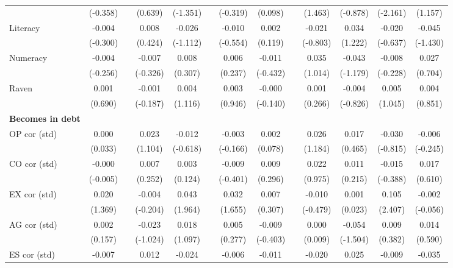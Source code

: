 \begin{table}[htbp]
{\begin{tabular}{lcccccccccccc}
      & (-0.358) &   & (0.639) & (-1.351) &   & (-0.319) & (0.098) &   & (1.463) & (-0.878) & (-2.161) & (1.157) \\
    Literacy & -0.004 &   & 0.008 & -0.026 &   & -0.010 & 0.002 &   & -0.021 & 0.034 & -0.020 & -0.045 \\
      & (-0.300) &   & (0.424) & (-1.112) &   & (-0.554) & (0.119) &   & (-0.803) & (1.222) & (-0.637) & (-1.430) \\
    Numeracy & -0.004 &   & -0.007 & 0.008 &   & 0.006 & -0.011 &   & 0.035 & -0.043 & -0.008 & 0.027 \\
      & (-0.256) &   & (-0.326) & (0.307) &   & (0.237) & (-0.432) &   & (1.014) & (-1.179) & (-0.228) & (0.704) \\
    Raven & 0.001 &   & -0.001 & 0.004 &   & 0.003 & -0.000 &   & 0.001 & -0.004 & 0.005 & 0.004 \\
      & (0.690) &   & (-0.187) & (1.116) &   & (0.946) & (-0.140) &   & (0.266) & (-0.826) & (1.045) & (0.851) \\
    \midrule
    \textbf{Becomes in debt} &   &   &   &   &   &   &   &   &   &   &   &  \\
    OP cor (std) & 0.000 &   & 0.023 & -0.012 &   & -0.003 & 0.002 &   & 0.026 & 0.017 & -0.030 & -0.006 \\
      & (0.033) &   & (1.104) & (-0.618) &   & (-0.166) & (0.078) &   & (1.184) & (0.465) & (-0.815) & (-0.245) \\
    CO cor (std) & -0.000 &   & 0.007 & 0.003 &   & -0.009 & 0.009 &   & 0.022 & 0.011 & -0.015 & 0.017 \\
      & (-0.005) &   & (0.252) & (0.124) &   & (-0.401) & (0.296) &   & (0.975) & (0.215) & (-0.388) & (0.610) \\
    EX cor (std) & 0.020 &   & -0.004 & \cellcolor[rgb]{ 1,  1,  0}0.043 &   & \cellcolor[rgb]{ 1,  1,  0}0.032 & 0.007 &   & -0.010 & 0.001 & \cellcolor[rgb]{ 1,  1,  0}0.105 & -0.002 \\
      & (1.369) &   & (-0.204) & (1.964) &   & (1.655) & (0.307) &   & (-0.479) & (0.023) & (2.407) & (-0.056) \\
    AG cor (std) & 0.002 &   & -0.023 & 0.018 &   & 0.005 & -0.009 &   & 0.000 & -0.054 & 0.009 & 0.014 \\
      & (0.157) &   & (-1.024) & (1.097) &   & (0.277) & (-0.403) &   & (0.009) & (-1.504) & (0.382) & (0.590) \\
    ES cor (std) & -0.007 &   & 0.012 & -0.024 &   & -0.006 & -0.011 &   & -0.020 & 0.025 & -0.009 & -0.035 \\

\end{tabular}}
\end{table}
